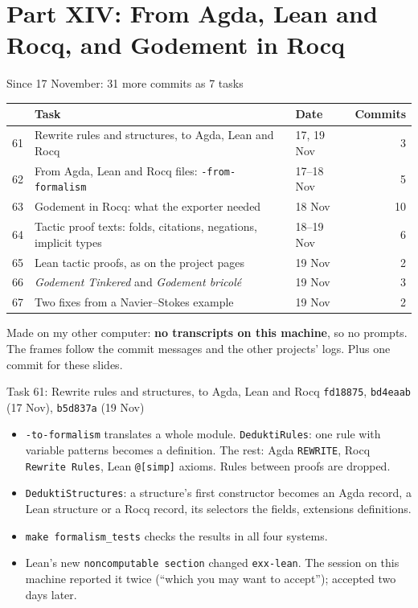 \documentclass[10pt,aspectratio=169]{beamer}
\newcommand{\bad}[1]{\textcolor{warn}{#1}}
\newcommand{\commit}[1]{\texttt{\footnotesize #1}}
\begin{document}
\section{Part XIV: From Agda, Lean and Rocq, and Godement in Rocq}

\begin{frame}{Since 17 November: 31 more commits as 7 tasks}
  \footnotesize
  \begin{tabular}{rllr}
    \toprule
    & \textbf{Task} & \textbf{Date} & \textbf{Commits} \\
    \midrule
    61 & Rewrite rules and structures, to Agda, Lean and Rocq & 17, 19 Nov & 3 \\
    62 & From Agda, Lean and Rocq files: \texttt{-from-formalism} & 17--18 Nov & 5 \\
    \midrule
    63 & Godement in Rocq: what the exporter needed & 18 Nov & 10 \\
    64 & Tactic proof texts: folds, citations, negations, implicit types & 18--19 Nov & 6 \\
    65 & Lean tactic proofs, as on the project pages & 19 Nov & 2 \\
    66 & \emph{Godement Tinkered} and \emph{Godement bricolé} & 19 Nov & 3 \\
    67 & Two fixes from a Navier--Stokes example & 19 Nov & 2 \\
    \bottomrule
  \end{tabular}

  \vspace{0.5em}
  \small Made on my other computer: \textbf{no transcripts on this machine}, so no prompts. The
  frames follow the commit messages and the other projects' logs. Plus one commit for these
  slides.
\end{frame}

\begin{frame}{Task 61: Rewrite rules and structures, to Agda, Lean and Rocq}
  \commit{fd18875}, \commit{bd4eaab} (17 Nov), \commit{b5d837a} (19 Nov)
  \begin{itemize}\small
    \item \texttt{-to-formalism} translates a whole module. \texttt{DeduktiRules}: one rule with
          variable patterns becomes a definition. The rest: Agda \texttt{REWRITE}, Rocq
          \texttt{Rewrite Rules}, Lean \texttt{@[simp]} axioms. Rules between proofs are dropped.
    \item \texttt{DeduktiStructures}: a structure's first constructor becomes an Agda record, a
          Lean structure or a Rocq record, its selectors the fields, extensions definitions.
    \item \texttt{make formalism\_tests} checks the results in all four systems.
    \item Lean's new \texttt{noncomputable section} changed \texttt{exx-lean}. The session on
          this machine reported it twice (``which you may want to accept''); \bad{accepted two
          days later}.
  \end{itemize}
\end{frame}
\end{document}

